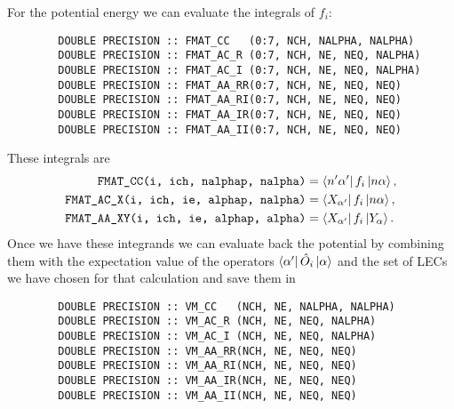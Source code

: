 \documentclass[10pt,a4paper]{article}
\DeclarePairedDelimiter\Bra{\langle}{\rvert}
\DeclarePairedDelimiter\Ket{\lvert}{\rangle}
\newcommand{\bra}[1]{\Bra{#1}}
\newcommand{\ket}[1]{\Ket{#1}}
\newcommand{\matrixelement}[3]{\bra{#1}\,#2\,\ket{#3}}
\begin{document}
	 For the potential energy we can evaluate the integrals of $f_i$:
	 \begin{verbatim}
	 	DOUBLE PRECISION :: FMAT_CC   (0:7, NCH, NALPHA, NALPHA)
	 	DOUBLE PRECISION :: FMAT_AC_R (0:7, NCH, NE, NEQ, NALPHA)
	 	DOUBLE PRECISION :: FMAT_AC_I (0:7, NCH, NE, NEQ, NALPHA)
	 	DOUBLE PRECISION :: FMAT_AA_RR(0:7, NCH, NE, NEQ, NEQ)
	 	DOUBLE PRECISION :: FMAT_AA_RI(0:7, NCH, NE, NEQ, NEQ)
	 	DOUBLE PRECISION :: FMAT_AA_IR(0:7, NCH, NE, NEQ, NEQ)
	 	DOUBLE PRECISION :: FMAT_AA_II(0:7, NCH, NE, NEQ, NEQ)
	 \end{verbatim}
	 These integrals are
	 \begin{align}
	 \texttt{FMAT\_CC(i, ich, nalphap, nalpha)} &= \matrixelement{n'\alpha'}{f_i}{n\alpha}\,,\\
	 \texttt{FMAT\_AC\_X(i, ich, ie, alphap, nalpha)} &= \matrixelement{X_{\alpha'}}{f_i}{n\alpha}\,,\\
	 \texttt{FMAT\_AA\_XY(i, ich, ie, alphap, alpha)} &= \matrixelement{X_{\alpha'}}{f_i}{Y_\alpha}\,.
	 \end{align}
	 Once we have these integrands we can evaluate back the potential by combining them with the expectation value of the operators $\matrixelement{\alpha'}{\hat{O}_i}{\alpha}$ and the set of LECs we have chosen for that calculation and save them in 
	 \begin{verbatim}
	 	DOUBLE PRECISION :: VM_CC   (NCH, NE, NALPHA, NALPHA)
	 	DOUBLE PRECISION :: VM_AC_R (NCH, NE, NEQ, NALPHA)
	 	DOUBLE PRECISION :: VM_AC_I (NCH, NE, NEQ, NALPHA)
	 	DOUBLE PRECISION :: VM_AA_RR(NCH, NE, NEQ, NEQ)
	 	DOUBLE PRECISION :: VM_AA_RI(NCH, NE, NEQ, NEQ)
	 	DOUBLE PRECISION :: VM_AA_IR(NCH, NE, NEQ, NEQ)
	 	DOUBLE PRECISION :: VM_AA_II(NCH, NE, NEQ, NEQ)
	 \end{verbatim}
	 
	 
	 
\end{document}
